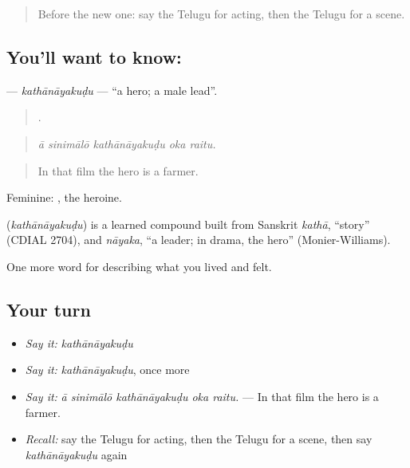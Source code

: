 \label{lesson:TE-C541-kathanayakudu}



\begin{quote}
Before the new one: say the Telugu for acting, then the Telugu for a scene.
\end{quote}

\subsection*{You'll want to know: }
\textbf{} — \emph{kathānāyakuḍu} — \textquotedblleft{}a hero; a male lead\textquotedblright{}.

\begin{quote}
    .
\end{quote}

\begin{quote}
\emph{ā sinimālō kathānāyakuḍu oka raitu.}
\end{quote}

\begin{quote}
In that film the hero is a farmer.
\end{quote}

Feminine: , the heroine.

\begin{cousinweb}
\textbf{} (\emph{kathānāyakuḍu}) is a learned compound built from Sanskrit \emph{kathā}, \textquotedblleft{}story\textquotedblright{} (CDIAL 2704), and \emph{nāyaka}, \textquotedblleft{}a leader; in drama, the hero\textquotedblright{} (Monier-Williams).
\end{cousinweb}

\begin{grammarlens}[title={What you've built}]
One more word for describing what you lived and felt.
\end{grammarlens}

\subsection*{Your turn}
\begin{itemize}
\raggedright
  \item \emph{Say it:} \emph{kathānāyakuḍu}
  \item \emph{Say it:} \emph{kathānāyakuḍu}, once more
  \item \emph{Say it:} \emph{ā sinimālō kathānāyakuḍu oka raitu.} — In that film the hero is a farmer.
  \item \emph{Recall:} say the Telugu for acting, then the Telugu for a scene, then say \emph{kathānāyakuḍu} again
\end{itemize}

